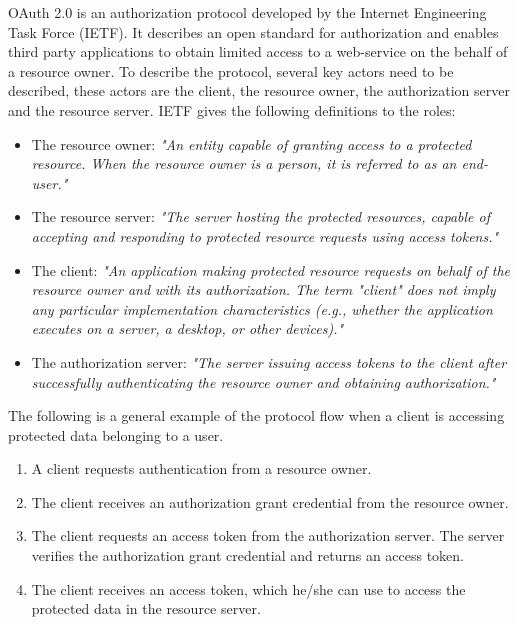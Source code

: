 \documentclass{cslthse-msc}
\begin{document}
OAuth 2.0 is an authorization protocol developed by the Internet Engineering Task Force (IETF). It describes an open standard for authorization and enables third party applications to obtain limited access to a web-service on the behalf of a resource owner\cite{oauth2spec}. To describe the protocol, several key actors need to be described, these actors are the client, the resource owner, the authorization server and the resource server. IETF gives the following definitions to the roles:

\begin{itemize}
	\item The resource owner: \textit{"An entity capable of granting access to a protected resource. When the resource owner is a person, it is referred to as an end-user."}
	\item The resource server: \textit{"The server hosting the protected resources, capable of accepting and responding to protected resource requests using access tokens."}
	\item The client: \textit{"An application making protected resource requests on behalf of the resource owner and with its authorization. The term "client" does not imply any particular implementation characteristics (e.g., whether the application executes on a server, a desktop, or other devices)."}
	\item The authorization server: \textit{"The server issuing access tokens to the client after successfully authenticating the resource owner and obtaining authorization."}
\end{itemize}

The following is a general example of the protocol flow when a client is accessing protected data belonging to a user. 

\begin{enumerate}
	\item A client requests authentication from a resource owner. 
	\item The client receives an authorization grant credential from the resource owner.    
	\item The client requests an access token from the authorization server. The server verifies the authorization grant credential and returns an access token. 
	\item The client receives an access token, which he/she can use to access the protected data in the resource server. 
\end{enumerate}
\end{document}
